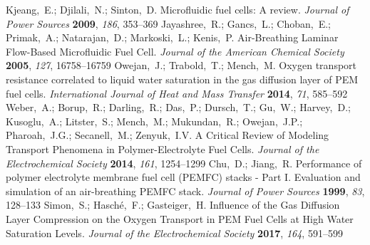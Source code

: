 \documentclass[aps,prl,twocolumn,superscriptaddress,groupedaddress]{revtex4}
\begin{document}
\begin{mcitethebibliography}{88}
Kjeang,~E.; Djilali,~N.; Sinton,~D. Microfluidic fuel cells: A review.
  \emph{Journal of Power Sources} \textbf{2009}, \emph{186}, 353--369\relax
\mciteBstWouldAddEndPuncttrue
\mciteSetBstMidEndSepPunct{\mcitedefaultmidpunct}
{\mcitedefaultendpunct}{\mcitedefaultseppunct}\relax
\EndOfBibitem
{}
Jayashree,~R.; Gancs,~L.; Choban,~E.; Primak,~A.; Natarajan,~D.; Markoski,~L.;
  Kenis,~P. Air-Breathing Laminar Flow-Based Microfluidic Fuel Cell.
  \emph{Journal of the American Chemical Society} \textbf{2005}, \emph{127},
  16758--16759\relax
\mciteBstWouldAddEndPuncttrue
\mciteSetBstMidEndSepPunct{\mcitedefaultmidpunct}
{\mcitedefaultendpunct}{\mcitedefaultseppunct}\relax
\EndOfBibitem
{}
Owejan,~J.; Trabold,~T.; Mench,~M. Oxygen transport resistance correlated to
  liquid water saturation in the gas diffusion layer of PEM fuel cells.
  \emph{International Journal of Heat and Mass Transfer} \textbf{2014},
  \emph{71}, 585--592\relax
\mciteBstWouldAddEndPuncttrue
\mciteSetBstMidEndSepPunct{\mcitedefaultmidpunct}
{\mcitedefaultendpunct}{\mcitedefaultseppunct}\relax
\EndOfBibitem
{}
Weber,~A.; Borup,~R.; Darling,~R.; Das,~P.; Dursch,~T.; Gu,~W.; Harvey,~D.;
  Kusoglu,~A.; Litster,~S.; Mench,~M.; Mukundan,~R.; Owejan,~J.P.; Pharoah,~J.G.; Secanell,~M.; Zenyuk,~I.V.
  A Critical Review of
  Modeling Transport Phenomena in Polymer-Electrolyte Fuel Cells. \emph{Journal
  of the Electrochemical Society} \textbf{2014}, \emph{161}, 1254--1299\relax
\mciteBstWouldAddEndPuncttrue
\mciteSetBstMidEndSepPunct{\mcitedefaultmidpunct}
{\mcitedefaultendpunct}{\mcitedefaultseppunct}\relax
\EndOfBibitem
{}
Chu,~D.; Jiang,~R. Performance of polymer electrolyte membrane fuel cell
  (PEMFC) stacks - Part I. Evaluation and simulation of an air-breathing PEMFC
  stack. \emph{Journal of Power Sources} \textbf{1999}, \emph{83},
  128--133\relax
\mciteBstWouldAddEndPuncttrue
\mciteSetBstMidEndSepPunct{\mcitedefaultmidpunct}
{\mcitedefaultendpunct}{\mcitedefaultseppunct}\relax
\EndOfBibitem
{}
Simon,~S.; Hasch{\'e},~F.; Gasteiger,~H. Influence of the Gas Diffusion Layer
  Compression on the Oxygen Transport in PEM Fuel Cells at High Water
  Saturation Levels. \emph{Journal of the Electrochemical Society}
  \textbf{2017}, \emph{164}, 591--599\relax
\mciteBstWouldAddEndPuncttrue
\mciteSetBstMidEndSepPunct{\mcitedefaultmidpunct}
{\mcitedefaultendpunct}{\mcitedefaultseppunct}\relax
\EndOfBibitem
\end{mcitethebibliography}
\end{document}
